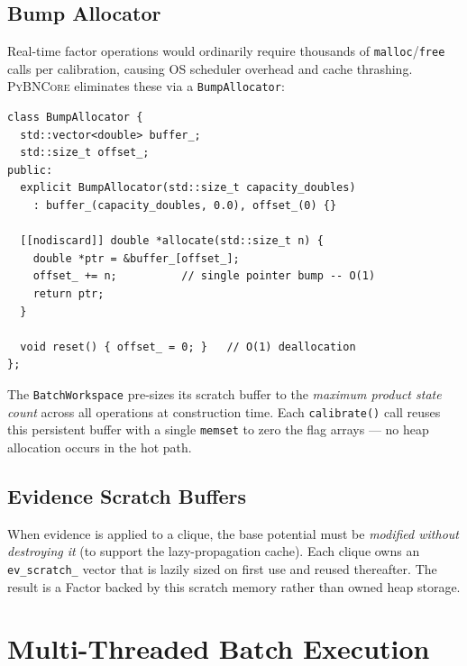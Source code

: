 \documentclass[11pt, letterpaper]{article}
\newcommand{\bncore}{\textsc{PyBNCore}}
\theoremstyle{definitionstyle}
\begin{document}
\subsection{Bump Allocator}

Real-time factor operations would ordinarily require thousands of
\texttt{malloc}/\texttt{free} calls per calibration, causing OS scheduler
overhead and cache thrashing. \bncore{} eliminates these via a
\texttt{BumpAllocator}:

\begin{lstlisting}[style=cppstyle, caption={\texttt{BumpAllocator} — O(1) allocation and reset}]
class BumpAllocator {
  std::vector<double> buffer_;
  std::size_t offset_;
public:
  explicit BumpAllocator(std::size_t capacity_doubles)
    : buffer_(capacity_doubles, 0.0), offset_(0) {}

  [[nodiscard]] double *allocate(std::size_t n) {
    double *ptr = &buffer_[offset_];
    offset_ += n;          // single pointer bump -- O(1)
    return ptr;
  }

  void reset() { offset_ = 0; }   // O(1) deallocation
};
\end{lstlisting}

\noindent
The \texttt{BatchWorkspace} pre-sizes its scratch buffer to the
\emph{maximum product state count} across all operations at construction
time. Each \texttt{calibrate()} call reuses this persistent buffer with
a single \texttt{memset} to zero the flag arrays — no heap allocation
occurs in the hot path.

\subsection{Evidence Scratch Buffers}

When evidence is applied to a clique, the base potential must be
\emph{modified without destroying it} (to support the lazy-propagation
cache). Each clique owns an \texttt{ev\_scratch\_} vector that is
lazily sized on first use and reused thereafter. The result is a Factor
backed by this scratch memory rather than owned heap storage.


\section{Multi-Threaded Batch Execution}
\label{sec:engine}
\end{document}
